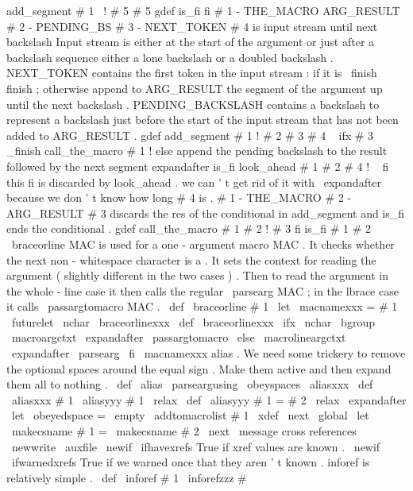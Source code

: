 {{{{{%
add_segment
#
1
\
!
{
}
#
5
#
5
%
}
gdef
is_fi
{
fi
}
%
#
1
-
THE_MACRO
ARG_RESULT
%
#
2
-
PENDING_BS
%
#
3
-
NEXT_TOKEN
%
#
4
is
input
stream
until
next
backslash
%
%
Input
stream
is
either
at
the
start
of
the
argument
or
just
after
a
%
backslash
sequence
either
a
lone
backslash
or
a
doubled
backslash
.
%
NEXT_TOKEN
contains
the
first
token
in
the
input
stream
:
if
it
is
\
finish
%
finish
;
otherwise
append
to
ARG_RESULT
the
segment
of
the
argument
up
until
%
the
next
backslash
.
PENDING_BACKSLASH
contains
a
backslash
to
represent
%
a
backslash
just
before
the
start
of
the
input
stream
that
has
not
been
%
added
to
ARG_RESULT
.
gdef
add_segment
#
1
!
#
2
#
3
#
4
\
{
%
ifx
#
3
_finish
call_the_macro
#
1
!
%
else
%
append
the
pending
backslash
to
the
result
followed
by
the
next
segment
expandafter
is_fi
look_ahead
#
1
#
2
#
4
!
{
\
}
fi
%
this
fi
is
discarded
by
look_ahead
.
%
we
can
'
t
get
rid
of
it
with
\
expandafter
because
we
don
'
t
know
how
%
long
#
4
is
.
}
%
#
1
-
THE_MACRO
%
#
2
-
ARG_RESULT
%
#
3
discards
the
res
of
the
conditional
in
add_segment
and
is_fi
ends
the
%
conditional
.
gdef
call_the_macro
#
1
#
2
!
#
3
fi
{
is_fi
#
1
{
#
2
}
}
}
%
%
%
%
%
%
%
%
%
%
%
%
%
%
%
%
%
%
%
%
%
%
%
%
%
%
%
%
%
%
%
%
%
%
%
%
%
%
%
%
%
%
%
%
%
%
%
%
\
braceorline
MAC
is
used
for
a
one
-
argument
macro
MAC
.
It
checks
%
whether
the
next
non
-
whitespace
character
is
a
{
.
It
sets
the
context
%
for
reading
the
argument
(
slightly
different
in
the
two
cases
)
.
Then
%
to
read
the
argument
in
the
whole
-
line
case
it
then
calls
the
regular
%
\
parsearg
MAC
;
in
the
lbrace
case
it
calls
\
passargtomacro
MAC
.
%
\
def
\
braceorline
#
1
{
\
let
\
macnamexxx
=
#
1
\
futurelet
\
nchar
\
braceorlinexxx
}
\
def
\
braceorlinexxx
{
%
\
ifx
\
nchar
\
bgroup
\
macroargctxt
\
expandafter
\
passargtomacro
\
else
\
macrolineargctxt
\
expandafter
\
parsearg
\
fi
\
macnamexxx
}
%
alias
.
%
We
need
some
trickery
to
remove
the
optional
spaces
around
the
equal
%
sign
.
Make
them
active
and
then
expand
them
all
to
nothing
.
%
\
def
\
alias
{
\
parseargusing
\
obeyspaces
\
aliasxxx
}
\
def
\
aliasxxx
#
1
{
\
aliasyyy
#
1
\
relax
}
\
def
\
aliasyyy
#
1
=
#
2
\
relax
{
%
{
%
\
expandafter
\
let
\
obeyedspace
=
\
empty
\
addtomacrolist
{
#
1
}
%
\
xdef
\
next
{
\
global
\
let
\
makecsname
{
#
1
}
=
\
makecsname
{
#
2
}
}
%
}
%
\
next
}
\
message
{
cross
references
}
\
newwrite
\
auxfile
\
newif
\
ifhavexrefs
%
True
if
xref
values
are
known
.
\
newif
\
ifwarnedxrefs
%
True
if
we
warned
once
that
they
aren
'
t
known
.
%
inforef
is
relatively
simple
.
\
def
\
inforef
#
1
{
\
inforefzzz
#
}}}}}

